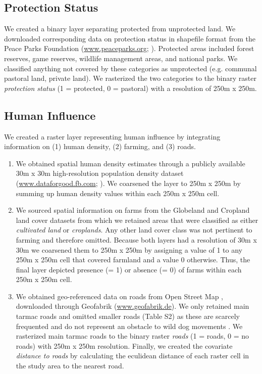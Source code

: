 \documentclass[abstract=off,10pt,a4paper,bibliography=totocnumbered]{article}
\begin{document}
\subsection{Protection Status}
We created a binary layer separating protected from unprotected land. We
downloaded corresponding data on protection status in shapefile format from the
Peace Parks Foundation (\url{www.peaceparks.org}; \citealp{PeaceParks.2019}).
Protected areas included forest reserves, game reserves, wildlife management
areas, and national parks. We classified anything not covered by these
categories as unprotected (e.g. communal pastoral land, private land). We
rasterized the two categories to the binary raster \textit{protection status} (1
= protected, 0 = pastoral) with a resolution of 250m x 250m.

\subsection{Human Influence}
We created a raster layer representing human influence by integrating
information on (1) human density, (2) farming, and (3) roads.

\begin{enumerate}[label = (\arabic*)]

  \item We obtained spatial human density estimates through a publicly available
  30m x 30m high-resolution population density dataset
  (\url{www.dataforgood.fb.com}; \citealp{Facebook.2019}). We coarsened the
  layer to 250m x 250m by summing up human density values within each 250m x
  250m cell.

  \item We sourced spatial information on farms from the Globeland
  \citep{Chen.2015} and Cropland \citep{Xiong.2017} land cover datasets from
  which we retained areas that were classified as either \textit{cultivated
  land} or \textit{croplands}. Any other land cover class was not pertinent to
  farming and therefore omitted. Because both layers had a resolution of 30m x
  30m we coarsened them to 250m x 250m by assigning a value of 1 to any 250m x
  250m cell that covered farmland and a value 0 otherwise. Thus, the final layer
  depicted presence (= 1) or absence (= 0) of farms within each 250m x 250m
  cell.

  \item We obtained geo-referenced data on roads from Open Street Map
  \citep{OpenStreetMap.2019}, downloaded through Geofabrik
  (\url{www.geofabrik.de}). We only retained main tarmac roads and omitted
  smaller roads (Table S2) as these are scarcely frequented and do not represent
  an obstacle to wild dog movements \citep{Abrahms.2016}. We rasterized main
  tarmac roads to the binary raster \textit{roads} (1 = roads, 0 = no roads)
  with 250m x 250m resolution. Finally, we created the covariate
  \textit{distance to roads} by calculating the eculidean distance of each
  raster cell in the study area to the nearest road.

\end{enumerate}
\end{document}
